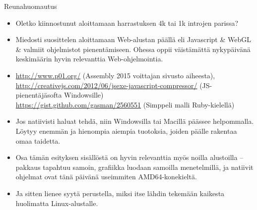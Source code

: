 \documentclass[pdf,10pt]{beamer}
\begin{document}
\begin{frame}{Reunahuomautus}
  \begin{itemize}
    \item Oletko kiinnostunut aloittamaan harrastuksen 4k tai 1k
      introjen parissa?
    \item Miedosti suosittelen aloittamaan Web-alustan päällä eli
      Javascript \& WebGL \& valmiit ohjelmistot
      pienentämiseen. Ohessa oppii väistämättä nykypäivänä keskimäärin
      hyvin relevanttia Web-ohjelmointia.
    \item[]
      {\tiny  \url{http://www.p01.org/} (Assembly 2015 voittajan sivusto aiheesta),\\
      \url{http://creativejs.com/2012/06/jsexe-javascript-compressor/}
      (JS-pienentäjäsofta Windowsille)\\
      \url{https://gist.github.com/gasman/2560551} (Simppeli malli
      Ruby-kielellä)\\
      }
      
    \item Jos natiivisti haluat tehdä, niin Windowsilla tai Macillä
      päässee helpommalla. Löytyy enemmän ja hienompia aiempia
      tuotoksia, joiden päälle rakentaa omaa taidetta.
    \item Osa tämän esityksen sisällöstä on hyvin relevanttia myös
      noilla alustoilla -- pakkaus tapahtuu samoin, grafiikka luodaan
      samoilla menetelmillä, ja natiivit ohjelmat ovat tänä päivänä
      useimmiten AMD64-konekieltä.
    \item Ja sitten lienee syytä perustella, miksi itse lähdin
      tekemään kaikesta huolimatta Linux-alustalle.
  \end{itemize}
\end{frame}
\end{document}
